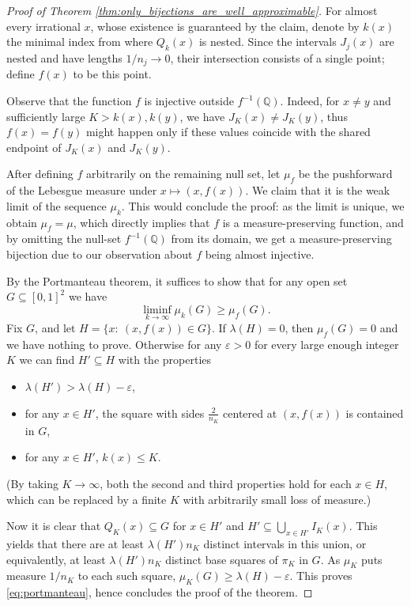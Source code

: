 \documentclass[10pt,a4paper]{amsart}
\begin{document}
\begin{proof}[Proof of Theorem \ref{thm:only_bijections_are_well_approximable}]
    For almost every irrational $x$, whose existence is guaranteed by the claim, denote by $k(x)$ the minimal index from where $Q_k(x)$ is nested. Since the intervals \(J_j(x)\) are nested and have lengths \(1/n_j\to0\), their intersection consists of a single point; define \(f(x)\) to be this point.
     
    Observe that the function \(f\) is injective outside \(f^{-1}(\mathbb Q)\). Indeed, for $x\neq y$ and sufficiently large $K>k(x), k(y)$, we have $J_K(x)\neq J_K(y)$, thus $f(x)=f(y)$ might happen only if these values coincide with the shared endpoint of $J_K(x)$ and $J_K(y)$.
    
    After defining \(f\) arbitrarily on the remaining null set, let \(\mu_f\) be the pushforward of the Lebesgue measure under \(x\mapsto(x,f(x))\). We claim that it is the weak limit of the sequence $\mu_{k}$. This would conclude the proof: as the limit is unique, we obtain $\mu_f = \mu$, which directly implies that $f$ is a measure-preserving function, and by omitting the null-set $f^{-1}(\mathbb{Q})$ from its domain, we get a measure-preserving bijection due to our observation about $f$ being almost injective.

    By the Portmanteau theorem, it suffices to show that for any open set $G\subseteq [0, 1]^2$ we have
    \begin{equation}\label{eq:portmanteau}
    \liminf_{k\to\infty} \mu_k(G)\geq \mu_f(G).
    \end{equation}
    Fix $G$, and let $H=\{x:\ (x, f(x))\in G\}$. If $\lambda(H)=0$, then $\mu_f(G)=0$ and we have nothing to prove. Otherwise for any $\varepsilon>0$ for every large enough integer $K$ we can find $H'\subseteq H$ with the properties 
    \begin{itemize}
    \item $\lambda(H')>\lambda(H)-\varepsilon$,
    \item for any $x\in H'$, the square with sides $\frac{2}{n_K}$ centered at $(x, f(x))$ is contained in $G$,
    \item for any $x\in H'$, $k(x)\leq K$.
    \end{itemize}
    (By taking $K\to \infty$, both the second and third properties hold for each $x\in H$, which can be replaced by a finite $K$ with arbitrarily small loss of measure.)

    Now it is clear that $Q_K(x)\subseteq G$ for $x\in H'$ and $H'\subseteq \bigcup_{x\in H'} I_K(x)$. This yields that there are at least $\lambda(H')n_K$ distinct intervals in this union, or equivalently, at least $\lambda(H')n_K$ distinct base squares of $\pi_K$ in $G$. As $\mu_K$ puts measure $1/n_K$ to each such square, $\mu_K(G)\geq \lambda(H)-\varepsilon$. This proves \eqref{eq:portmanteau}, hence concludes the proof of the theorem.
    
\end{proof}
\end{document}
